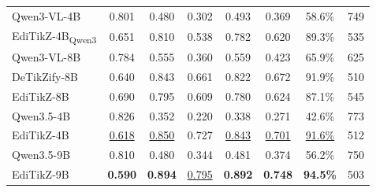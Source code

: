 \begin{table}[t]
\begin{tabular}{lcccc:c:cc}
Qwen3-VL-4B
& 0.801 & 0.480 & 0.302 & 0.493
& 0.369
& 58.6\% & 749 \\

EdiTikZ-4B\textsubscript{Qwen3}
& 0.651 & 0.810 & 0.538 & 0.782
& 0.620
& 89.3\% & 535 \\

\midrule

Qwen3-VL-8B
& 0.784 & 0.555 & 0.360 & 0.559
& 0.423
& 65.9\% & 625 \\

DeTikZify-8B
& 0.640 & 0.843 & 0.661 & 0.822
& 0.672
& 91.9\% & 510 \\

EdiTikZ-8B
& 0.690 & 0.795 & 0.609 & 0.780
& 0.624
& 87.1\% & 545 \\

\midrule

Qwen3.5-4B
& 0.826 & 0.352 & 0.220 & 0.338
& 0.271
& 42.6\% & 773 \\

EdiTikZ-4B
& \underline{0.618} & \underline{0.850} & 0.727 & \underline{0.843}
& \underline{0.701}
& \underline{91.6\%} & 512 \\

\midrule

Qwen3.5-9B
& 0.810 & 0.480 & 0.344 & 0.481
& 0.374
& 56.2\% & 750 \\

EdiTikZ-9B
& \textbf{0.590} & \textbf{0.894} & \underline{0.795} & \textbf{0.892}
& \textbf{0.748}
& \textbf{94.5\%} & 503 \\

\bottomrule
\end{tabular}
\end{table}
